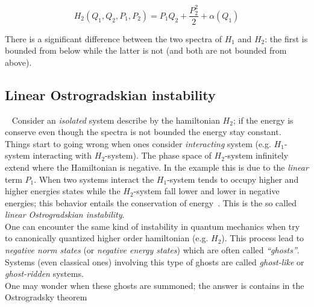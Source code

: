 \begin{equation} \label{eq: second-order_motion_eq_ham}
  H_2(Q_1, Q_2, P_1, P_2) = P_1Q_2 + \frac{P_2^2}{2} + \alpha(Q_1)
\end{equation}

There is a significant difference between the two spectra of $H_1$ and $H_2$:
the first is bounded from below while the latter is not (and both are not
bounded from above).


\subsection{Linear Ostrogradskian instability}~\label{
subsection:linear_ostrogradskian_instability}
Consider an \emph{isolated} system describe by the hamiltonian $H_2$; if the
energy is conserve even though the spectra is not bounded the energy stay
constant. Things start to going wrong when ones consider \emph{interacting}
system (e.g. $H_1$-system interacting with $H_2$-system). The phase space of
$H_2$-system infinitely extend where the Hamiltonian is negative. In the example
this is due to the \emph{linear} term $P_1$. When two systems interact the
$H_1$-system tends to occupy higher and higher energies states while the
$H_2$-system fall lower and lower in negative energies; this behavior entails
the conservation of energy~\cite{Kallosh08, Eliezer89}.
This is the so called \emph{linear Ostrogradskian instability}. \\

One can encounter the same kind of instability in quantum mechanics when try to
canonically quantized higher order hamiltonian (e.g. $H_2$). This process lead
to \emph{negative norm states} (or \emph{negative energy states}) which are
often called \emph{``ghosts''}. Systems (even classical ones) involving this
type of ghosts are called \emph{ghost-like} or \emph{ghost-ridden} systems. \\

One may wonder when these ghosts are summoned; the answer is contains in the
Ostrogradsky theorem %

